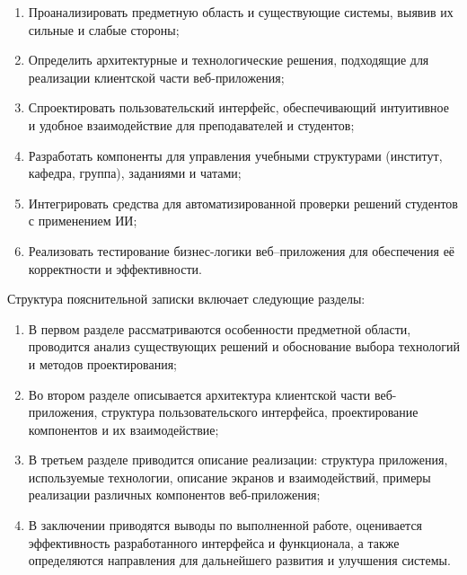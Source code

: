 \begin{enumerate}
  \item Проанализировать предметную область и существующие системы, выявив их сильные и слабые стороны;
  \item Определить архитектурные и технологические решения, подходящие для реализации клиентской части веб-приложения;
  \item Спроектировать пользовательский интерфейс, обеспечивающий интуитивное и удобное взаимодействие для преподавателей и студентов;
  \item Разработать компоненты для управления учебными структурами (институт, кафедра, группа), заданиями и чатами;
  \item Интегрировать средства для автоматизированной проверки решений студентов с применением ИИ;
  \item Реализовать тестирование бизнес-логики веб–приложения для обеспечения её корректности и эффективности.
\end{enumerate}

Структура пояснительной записки включает следующие разделы:
\begin{enumerate}
  \item В первом разделе рассматриваются особенности предметной области, проводится анализ существующих решений и обоснование выбора технологий и методов проектирования;
  \item Во втором разделе описывается архитектура клиентской части веб-приложения, структура пользовательского интерфейса, проектирование компонентов и их взаимодействие;
  \item В третьем разделе приводится описание реализации: структура приложения, используемые технологии, описание экранов и взаимодействий, примеры реализации различных компонентов веб-приложения;
  \item В заключении приводятся выводы по выполненной работе, оценивается эффективность разработанного интерфейса и функционала, а также определяются направления для дальнейшего развития и улучшения системы.
\end{enumerate}
